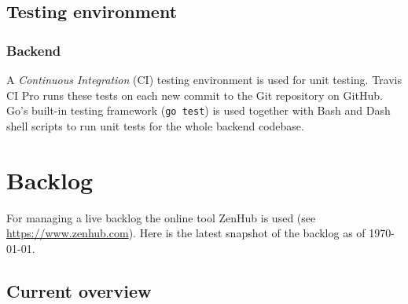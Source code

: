 \documentclass{article}
\begin{document}
\subsection{Testing environment}
\subsubsection*{Backend}
A \emph{Continuous Integration} (CI) testing environment is used for unit testing. Travis CI Pro runs these tests on each new commit to the Git repository on GitHub. Go's built-in testing framework (\texttt{go test}) is used together with Bash and Dash shell scripts to run unit tests for the whole backend codebase.

\newpage
\section{Backlog}
For managing a live backlog the online tool ZenHub is used (see \url{https://www.zenhub.com}). Here is the latest snapshot of the backlog as of \today.

\subsection{Current overview}
\end{document}
